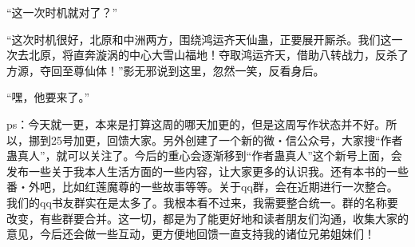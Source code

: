 \begin{this_body}
“这一次时机就对了？”

“这次时机很好，北原和中洲两方，围绕鸿运齐天仙蛊，正要展开厮杀。我们这一次去北原，将直奔漩涡的中心大雪山福地！夺取鸿运齐天，借助八转战力，反杀了方源，夺回至尊仙体！”影无邪说到这里，忽然一笑，反看身后。

“嘿，他要来了。”

ps：今天就一更，本来是打算这周的哪天加更的，但是这周写作状态并不好。所以，挪到25号加更，回馈大家。另外创建了一个新的微・信公众号，大家搜“作者蛊真人”，就可以关注了。今后的重心会逐渐移到“作者蛊真人”这个新号上面，会发布一些关于我本人生活方面的一些内容，让大家更多的认识我。还有本书的一些番・外吧，比如红莲魔尊的一些故事等等。关于qq群，会在近期进行一次整合。我们的qq书友群实在是太多了。我根本看不过来，我需要整合统一。群的名称要改变，有些群要合并。这一切，都是为了能更好地和读者朋友们沟通，收集大家的意见，今后还会做一些互动，更方便地回馈一直支持我的诸位兄弟姐妹们！

\end{this_body}

